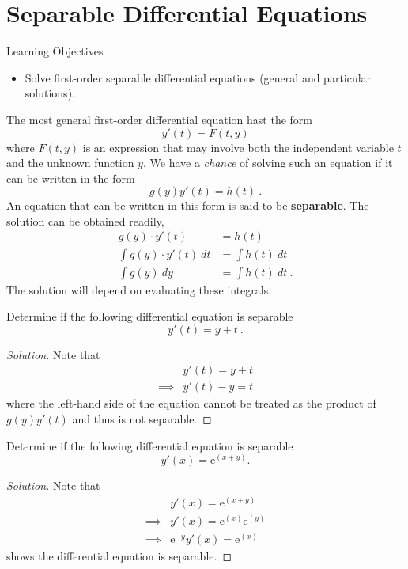\documentclass[compacto,10pt,comentarios]{aleph-notas}
\begin{document}
\encabezado

\section*{Separable Differential Equations}
\begin{mdframed}
    \center Learning Objectives \\
    \begin{itemize}
        \item Solve first-order separable differential equations (general and particular solutions).
    \end{itemize}
\end{mdframed}

The most general first-order differential equation hast the form
$$
    y'(t) = F(t, y)
$$
where $F(t,y)$ is an expression that may involve both the independent variable $t$ and the unknown function $y$.
We have a \textit{chance} of solving such an equation if it can be written in the form
$$
    g(y) y'(t) = h(t) ~ .
$$
An equation that can be written in this form is said to be \textbf{separable}. The solution can be obtained readily,
\begin{align*}
    g(y) \cdot y'(t) & = h(t) \\
    \int g(y) \cdot y'(t) ~ dt & = \int h(t) ~ dt \\
    \int g(y) ~ dy & = \int h(t) ~ dt ~ .
\end{align*}
The solution will depend on evaluating these integrals.

\begin{ejer}
    Determine if the following differential equation is separable
    $$ 
        y'(t) = y + t ~ .
    $$
\end{ejer}
\begin{proof}[Solution]
    Note that 
    \begin{align*}
        & y'(t) = y + t \\
        \implies & y'(t) - y = t
    \end{align*}
    where the left-hand side of the equation cannot be treated as the product of $g(y) y'(t)$ and thus is not separable.
\end{proof}

\begin{ejer}
    Determine if the following differential equation is separable
    $$ 
        y'(x) = \mathrm{e}^{(x+y)}.
    $$
\end{ejer}
\begin{proof}[Solution]
    Note that 
    \begin{align*}
        & y'(x) = \mathrm{e}^{(x+y)}\\
        \implies & y'(x) = \mathrm{e}^{(x)}\mathrm{e}^{(y)} \\ 
        \implies & \mathrm{e}^{-y} y'(x) = \mathrm{e}^{(x)}
    \end{align*}
    shows the differential equation is separable.
\end{proof}
\end{document}
